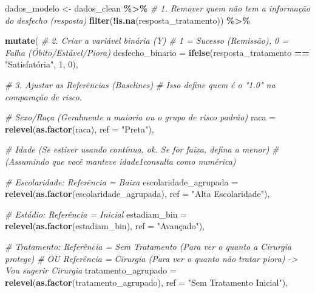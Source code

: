 \documentclass[
]{article}
\newenvironment{Shaded}{\begin{snugshade}}{\end{snugshade}}
\newcommand{\AttributeTok}[1]{\textcolor[rgb]{0.13,0.29,0.53}{#1}}
\newcommand{\CommentTok}[1]{\textcolor[rgb]{0.56,0.35,0.01}{\textit{#1}}}
\newcommand{\DecValTok}[1]{\textcolor[rgb]{0.00,0.00,0.81}{#1}}
\newcommand{\FunctionTok}[1]{\textcolor[rgb]{0.13,0.29,0.53}{\textbf{#1}}}
\newcommand{\NormalTok}[1]{#1}
\newcommand{\OtherTok}[1]{\textcolor[rgb]{0.56,0.35,0.01}{#1}}
\newcommand{\SpecialCharTok}[1]{\textcolor[rgb]{0.81,0.36,0.00}{\textbf{#1}}}
\newcommand{\StringTok}[1]{\textcolor[rgb]{0.31,0.60,0.02}{#1}}
\begin{document}
\begin{Shaded}
\begin{Highlighting}[]
\NormalTok{dados\_modelo }\OtherTok{\textless{}{-}}\NormalTok{ dados\_clean }\SpecialCharTok{\%\textgreater{}\%}
  \CommentTok{\# 1. Remover quem não tem a informação do desfecho (resposta)}
  \FunctionTok{filter}\NormalTok{(}\SpecialCharTok{!}\FunctionTok{is.na}\NormalTok{(resposta\_tratamento)) }\SpecialCharTok{\%\textgreater{}\%}
  
  \FunctionTok{mutate}\NormalTok{(}
    \CommentTok{\# 2. Criar a variável binária (Y)}
    \CommentTok{\# 1 = Sucesso (Remissão), 0 = Falha (Óbito/Estável/Piora)}
    \AttributeTok{desfecho\_binario =} \FunctionTok{ifelse}\NormalTok{(resposta\_tratamento }\SpecialCharTok{==} \StringTok{"Satisfatória"}\NormalTok{, }\DecValTok{1}\NormalTok{, }\DecValTok{0}\NormalTok{),}
    
    \CommentTok{\# 3. Ajustar as Referências (Baselines)}
    \CommentTok{\# Isso define quem é o "1.0" na comparação de risco.}
    
    \CommentTok{\# Sexo/Raça (Geralmente a maioria ou o grupo de risco padrão)}
    \AttributeTok{raca =} \FunctionTok{relevel}\NormalTok{(}\FunctionTok{as.factor}\NormalTok{(raca), }\AttributeTok{ref =} \StringTok{"Preta"}\NormalTok{), }
    
    \CommentTok{\# Idade (Se estiver usando contínua, ok. Se for faixa, defina a menor)}
    \CommentTok{\# (Assumindo que você manteve idade1consulta como numérica)}
    
    \CommentTok{\# Escolaridade: Referência = Baixa}
    \AttributeTok{escolaridade\_agrupada =} \FunctionTok{relevel}\NormalTok{(}\FunctionTok{as.factor}\NormalTok{(escolaridade\_agrupada), }\AttributeTok{ref =} \StringTok{"Alta Escolaridade"}\NormalTok{),}
    
    \CommentTok{\# Estádio: Referência = Inicial}
    \AttributeTok{estadiam\_bin =} \FunctionTok{relevel}\NormalTok{(}\FunctionTok{as.factor}\NormalTok{(estadiam\_bin), }\AttributeTok{ref =} \StringTok{"Avançado"}\NormalTok{),}
    
    \CommentTok{\# Tratamento: Referência = Sem Tratamento (Para ver o quanto a Cirurgia protege)}
    \CommentTok{\# OU Referência = Cirurgia (Para ver o quanto não tratar piora) {-}\textgreater{} Vou sugerir Cirurgia}
    \AttributeTok{tratamento\_agrupado =} \FunctionTok{relevel}\NormalTok{(}\FunctionTok{as.factor}\NormalTok{(tratamento\_agrupado), }\AttributeTok{ref =} \StringTok{"Sem Tratamento Inicial"}\NormalTok{),}
    

\end{Highlighting}
\end{Shaded}
\end{document}
